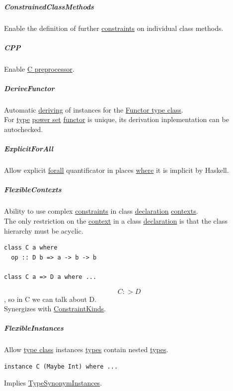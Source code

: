 \documentclass[11pt]{article}
\begin{document}
\subparagraph{\label{orgddafd2d}ConstrainedClassMethods}
\label{sec:orgcf8ec05}
Enable the definition of further \hyperref[orgcddf7a9]{constraints} on individual class methods.\\

\subparagraph{\label{org8f38874}CPP}
\label{sec:orga1b605a}
Enable \href{https://en.wikipedia.org/wiki/C\_preprocessor}{C preprocessor}.\\

\subparagraph{\label{orgccdf8f2}DeriveFunctor}
\label{sec:org38e1232}
Automatic \hyperref[orgab79d7a]{deriving} of instances for the \hyperref[org67c1dcb]{Functor type class}.\\
For \hyperref[orgc4aea2f]{type} \hyperref[org8dd7cb1]{power set} \hyperref[orgf2f6841]{functor} is unique, its derivation inplementation can be autochecked.\\

\subparagraph{\label{orgebd5f50}ExplicitForAll}
\label{sec:orgbd2ac70}
Allow explicit \hyperref[orga0ddc78]{forall} quantificator in places \hyperref[org3e5903d]{where} it is implicit by Haskell.\\

\subparagraph{\label{org62c291b}FlexibleContexts}
\label{sec:org4603a54}
Ability to use complex \hyperref[orgcddf7a9]{constraints} in class \hyperref[org8fbd848]{declaration} \hyperref[orge18c92a]{contexts}.\\
The only restriction on the \hyperref[org2ec7d4f]{context} in a class \hyperref[org8fbd848]{declaration} is that the class hierarchy must be acyclic.\\
\begin{verbatim}
class C a where
  op :: D b => a -> b -> b

class C a => D a where ...
\end{verbatim}
$$ C :> D $$, so in C we can talk about D.\\

Synergizes with \hyperref[org399f0c1]{ConstraintKinds}.\\

\subparagraph{\label{org8a6fe97}FlexibleInstances}
\label{sec:org07d4b6c}
Allow \hyperref[org16d8a26]{type class} instances \hyperref[org4209edd]{types} contain nested \hyperref[org4209edd]{types}.\\
\begin{verbatim}
instance C (Maybe Int) where ...
\end{verbatim}
Implies \hyperref[org0fa5d59]{TypeSynonymInstances}.\\
\end{document}
